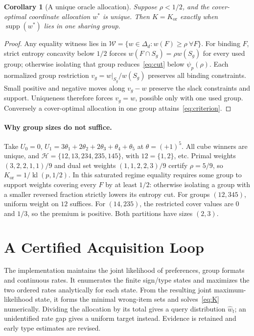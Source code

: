 \documentclass[sigconf,anonymous,review]{acmart}
\newtheorem{corollary}[theorem]{Corollary}
\newcommand{\kl}{\operatorname{kl}}
\newcommand{\Kor}{K_{\mathrm{or}}}
\newcommand{\cH}{\mathcal H}
\newcommand{\cW}{\mathcal W}
\begin{document}
\begin{corollary}[A unique oracle allocation]\label{cor:unique}
Suppose $\rho<1/2$, and the cover-optimal coordinate allocation $w^*$ is unique. Then $K=\Kor$ exactly when $\operatorname{supp}(w^*)$ lies in one sharing group.
\end{corollary}
\begin{proof}
Any equality witness lies in $\cW=\{w\in\Delta_d:w(F)\ge\rho\ \forall F\}$. For binding $F$, strict entropy concavity below $1/2$ forces $w(F\cap S_g)=\rho w(S_g)$ for every used group; otherwise isolating that group reduces~\eqref{eq:cut} below $\psi_p(\rho)$. Each normalized group restriction $v_g=w|_{S_g}/w(S_g)$ preserves all binding constraints. Small positive and negative moves along $v_g-w$ preserve the slack constraints and support. Uniqueness therefore forces $v_g=w$, possible only with one used group. Conversely a cover-optimal allocation in one group attains~\eqref{eq:criterion}.
\end{proof}

\paragraph{Why group sizes do not suffice.}
Take $U_0=0$, $U_1=3\theta_1+2\theta_2+2\theta_3+\theta_4+\theta_5$ at $\theta=(+1)^5$. All cube winners are unique, and
$\cH=\{12,13,234,235,145\}$, with $12=\{1,2\}$, etc. Primal weights $(3,2,2,1,1)/9$ and dual set weights $(1,1,2,2,3)/9$ certify $\rho=5/9$, so $\Kor=1/\kl(p,1/2)$. In this saturated regime equality requires some group to support weights covering every $F$ by at least $1/2$: otherwise isolating a group with a smaller reversed fraction strictly lowers its entropy cut. For groups $(12,345)$, uniform weight on $12$ suffices. For $(14,235)$, the restricted cover values are $0$ and $1/3$, so the premium is positive. Both partitions have sizes $(2,3)$.

\section{A Certified Acquisition Loop}
The implementation maintains the joint likelihood of preferences, group formats and continuous rates. It enumerates the finite sign/type states and maximizes the two ordered rates analytically for each state. From the resulting joint maximum-likelihood state, it forms the minimal wrong-item sets and solves~\eqref{eq:K} numerically. Dividing the allocation by its total gives a query distribution $\widehat w_t$; an unidentified rate gap gives a uniform target instead. Evidence is retained and early type estimates are revised.
\end{document}
